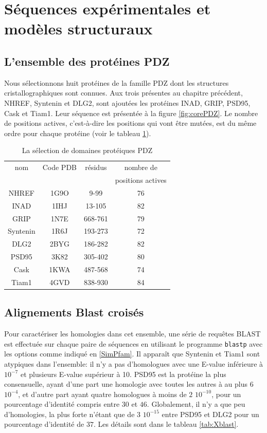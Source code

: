 \section{Séquences expérimentales et modèles structuraux}
\subsection{L'ensemble des protéines PDZ}
Nous sélectionnons huit protéines de la famille PDZ dont les structures cristallographiques sont connues. Aux trois présentes au chapitre précédent, NHREF, Syntenin et DLG2, sont ajoutées les protéines INAD, GRIP, PSD95, Cask et Tiam1. Leur séquence est présentée à la figure \ref{fig:corePDZ}. Le nombre de positions actives, c'est-à-dire les positions qui vont être mutées, est du même ordre pour chaque protéine (voir le tableau \ref{tab:protéines_PDZ}).

\begin{table}[!htbp]
  \centering
  \caption{La sélection de domaines protéiques PDZ}
  \begin{tabular}{cccc}
    \toprule
    nom & Code PDB & résidus &  nombre de \\
        &          &         & positions actives \\
    \cmidrule{1-4}
    NHREF    & 1G9O  & 9-99    & 76 \\
    INAD     & 1IHJ  & 13-105  & 82 \\
    GRIP     & 1N7E  & 668-761 & 79 \\
    Syntenin & 1R6J  & 193-273 & 72 \\
    DLG2     & 2BYG  & 186-282 & 82 \\
    PSD95    & 3K82  & 305-402 & 80 \\
    Cask     & 1KWA  & 487-568 & 74 \\
    Tiam1    & 4GVD  & 838-930 & 84 \\
    \bottomrule
    
  \end{tabular}      
  \label{tab:protéines_PDZ}      
\end{table}

\subsection{Alignements Blast croisés}
   
Pour caractériser les homologies dans cet ensemble, une série de requêtes BLAST est effectuée sur chaque paire de séquences en utilisant le programme \verb!blastp! avec les options comme indiqué en \ref{SimPfam}. Il apparaît que Syntenin et Tiam1 sont atypiques dans l'ensemble: il n'y a pas d'homologues avec une E-value inférieure à $10^{-7}$ et plusieurs E-value supérieur à 10. PSD95 est la protéine la plus consensuelle, ayant d'une part une homologie avec toutes les autres à au plus $6$ $10^{-4}$, et d'autre part ayant quatre homologues à moins de $2$ $10^{-10}$, pour un pourcentage d'identité compris entre $30$ et $46$. Globalement, il n'y a que peu d'homologies, la plus forte n'étant que de $3$ $10^{-15}$ entre PSD95 et DLG2 pour un pourcentage d'identité de $37$. Les détails sont dans le tableau \ref{tab:Xblast}.

